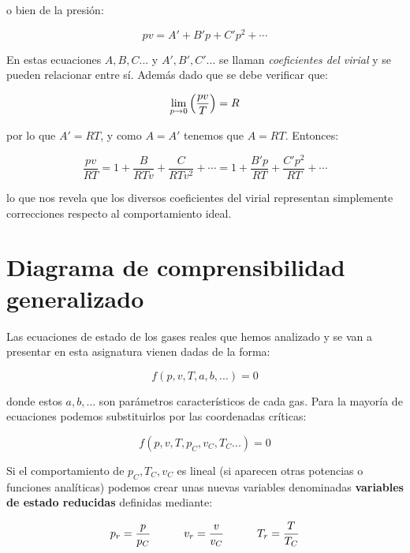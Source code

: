 \documentclass[12pt,a4paper,oneside]{book}
\begin{document}
o bien de la presión:

\begin{equation}
pv = A' + B' p + C' p^2 + \cdots
\end{equation}

En estas ecuaciones $A,B,C...$ y $A',B',C'...$ se llaman \textit{coeficientes del virial} y se pueden relacionar entre sí. Además dado que se debe verificar que:

\begin{equation}
\lim_{p \rightarrow 0} \left( \dfrac{pv}{T} \right) = R
\end{equation}

por lo que $A' = RT$, y como $A=A'$ tenemos que $A=RT$. Entonces:

\begin{equation}
\dfrac{pv}{RT}  = 1 + \dfrac{B}{RT v} + \dfrac{C}{RT v^2} + \cdots = 1 + \dfrac{B' p}{RT} + \dfrac{C' p^2}{RT} + \cdots
\end{equation}

lo que nos revela que los diversos coeficientes del virial representan simplemente correcciones respecto al comportamiento ideal.


\section{Diagrama de comprensibilidad generalizado}

Las ecuaciones de estado de los gases reales que hemos analizado y se van a presentar en esta asignatura vienen dadas de la forma:

\begin{equation}
f(p,v,T,a,b,...) = 0
\end{equation}

donde estos $a,b,...$ son parámetros característicos de cada gas. Para la mayoría de ecuaciones podemos substituirlos por las coordenadas críticas:

\begin{equation}
f(p,v,T,p_C,v_C,T_C...) = 0
\end{equation}

Si el comportamiento de $p_C,T_C,v_C$ es lineal (si aparecen otras potencias o funciones analíticas) podemos crear unas nuevas variables denominadas \textbf{variables de estado reducidas} definidas mediante:

\begin{equation}
p_r = \dfrac{p}{p_C} \quad \quad \quad v_r = \dfrac{v}{v_C} \quad \quad \quad T_r = \dfrac{T}{T_C}
\end{equation}
\end{document}
